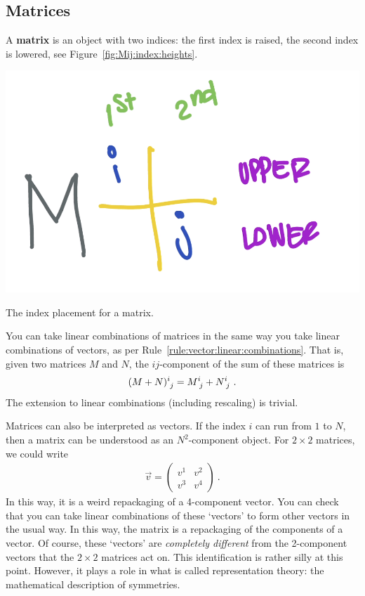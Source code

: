 \documentclass[12pt, oneside]{report}    %
\begin{document}
\subsection{Matrices}

A \textbf{matrix} is an object with two indices: the first index is raised, the second index is lowered, see Figure~\ref{fig:Mij:index:heights}.
\begin{marginfigure}%
    \includegraphics[width=.7\textwidth]{figures/Mij_indices.png}
    \caption{The index placement for a matrix.}
    \label{fig:Mij:index:heights}
\end{marginfigure}
You can take linear combinations of matrices in the same way you take linear combinations of vectors, as per Rule~\ref{rule:vector:linear:combinations}. That is, given two matrices $M$ and $N$, the $ij$-component of the sum of these matrices is
\begin{align}
    (M+N)\aij{i}{j} = M\aij{i}{j} + N\aij{i}{j} \ .
\end{align}
The extension to linear combinations (including rescaling) is trivial.
\begin{example}
Matrices can also be interpreted as vectors. If the index $i$ can run from $1$ to $N$, then a matrix can be understood as an $N^2$-component object. For $2\times 2$ matrices, we could write
\begin{align}
    \vec{v} = 
    \begin{pmatrix}
        v^1 & v^2 \\
        v^3 & v^4
    \end{pmatrix} \ .
\end{align}
In this way, it is a weird repackaging of a 4-component vector. You can check that you can take linear combinations of these `vectors' to form other vectors in the usual way. In this way, the matrix is a repackaging of the components of a vector. Of course, these `vectors' are \emph{completely different} from the 2-component vectors that the $2\times 2$ matrices act on. This identification is rather silly at this point. However, it plays a role in what is called representation theory: the mathematical description of symmetries.
\end{example}
\end{document}
